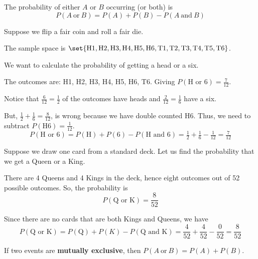 \documentclass{beamer}
\newcommand{\prob}[1]{P\left(#1\right)}
\begin{document}
\begin{frame}
\begin{definition}
The probability of either $A$ or $B$ occurring (or both) is
\begin{equation*}
\prob{A~\text{or}~B}=\prob{A}+\prob{B}-\prob{A~\text{and}~B}
\end{equation*}
\end{definition}\pause

\begin{example}
Suppose we flip a fair coin and roll a fair die. 

\vspace{2mm}
The sample space is $\set{\text{H1}, \text{H2}, \text{H3}, \text{H4}, \text{H5}, \text{H6}, \text{T1}, \text{T2}, \text{T3}, \text{T4}, \text{T5}, \text{T6}}$.

\vspace{2mm}
We want to calculate the probability of getting a head or a six.\pause

\vspace{2mm} 
The outcomes are: H1, H2, H3, H4, H5, H6, T6. Giving $\prob{\text{H or 6}} = \tfrac{7}{12}$.\pause

\vspace{2mm}
Notice that $\tfrac{6}{12}=\tfrac{1}{2}$ of the outcomes have heads and $\tfrac{2}{12}=\tfrac{1}{6}$ have a six. \pause

\vspace{2mm}
But, $\tfrac{1}{2}+\tfrac{1}{6}=\frac{8}{12}$, is wrong because we have double counted H6. Thus, we need to subtract $\prob{\text{H6}}=\tfrac{1}{12}$.
\begin{equation*}
\prob{\text{H or 6}} = \prob{\text{H}}+\prob{6}-\prob{\text{H and 6}} = \tfrac{1}{2}+\tfrac{1}{6}-\tfrac{1}{12}=\tfrac{7}{12}
\end{equation*}
\end{example}
\end{frame}

\begin{frame}
\begin{example}
Suppose we draw one card from a standard deck. Let us find the probability that we get a Queen or a King.\pause

\vspace{2mm}
There are 4 Queens and 4 Kings in the deck, hence eight outcomes out of 52 possible outcomes. So, the probability is
\begin{equation*}
\prob{\text{Q or K}} = \dfrac{8}{52}
\end{equation*}\pause

Since there are no cards that are both Kings and Queens, we have
\begin{equation*}
\prob{\text{Q or K}} = \prob{\text{Q}} + \prob{K} - \prob{\text{Q and K}} = \dfrac{4}{52}+\dfrac{4}{52}-\dfrac{0}{52} = \dfrac{8}{52}
\end{equation*}
\end{example}\pause

\begin{note}
If two events are \textbf{mutually exclusive}, then $\prob{A~\text{or}~B} = \prob{A}+\prob{B}$.
\end{note}
\end{frame}
\end{document}
